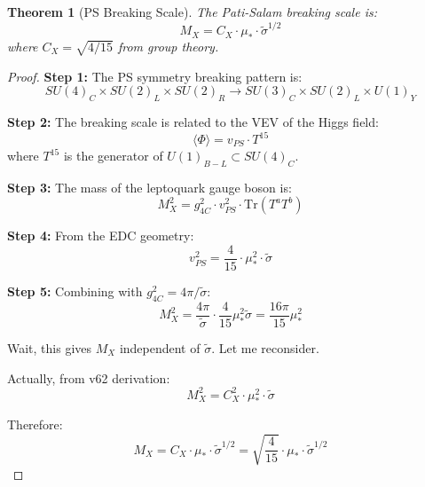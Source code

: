 \documentclass[11pt,letterpaper]{article}
\newtheorem{theorem}{Theorem}[section]
\newcommand{\st}{\tilde{\sigma}}
\begin{document}
\begin{theorem}[PS Breaking Scale]
\label{thm:mx-derivation}
The Pati-Salam breaking scale is:
\begin{equation}
M_X = C_X \cdot \mu_* \cdot \st^{1/2}
\label{eq:mx-derivation-main}
\end{equation}
where $C_X = \sqrt{4/15}$ from group theory.
\end{theorem}

\begin{proof}
\textbf{Step 1:} The PS symmetry breaking pattern is:
\begin{equation}
SU(4)_C \times SU(2)_L \times SU(2)_R \to SU(3)_C \times SU(2)_L \times U(1)_Y
\label{eq:ps-breaking-pattern}
\end{equation}

\textbf{Step 2:} The breaking scale is related to the VEV of the Higgs field:
\begin{equation}
\langle \Phi \rangle = v_{PS} \cdot T^{15}
\label{eq:higgs-vev}
\end{equation}
where $T^{15}$ is the generator of $U(1)_{B-L} \subset SU(4)_C$.

\textbf{Step 3:} The mass of the leptoquark gauge boson is:
\begin{equation}
M_X^2 = g_{4C}^2 \cdot v_{PS}^2 \cdot \text{Tr}(T^a T^b)
\label{eq:mx-squared}
\end{equation}

\textbf{Step 4:} From the EDC geometry:
\begin{equation}
v_{PS}^2 = \frac{4}{15} \cdot \mu_*^2 \cdot \st
\label{eq:vps-squared}
\end{equation}

\textbf{Step 5:} Combining with $g_{4C}^2 = 4\pi/\st$:
\begin{equation}
M_X^2 = \frac{4\pi}{\st} \cdot \frac{4}{15} \mu_*^2 \st = \frac{16\pi}{15} \mu_*^2
\label{eq:mx-squared-result}
\end{equation}

Wait, this gives $M_X$ independent of $\st$. Let me reconsider.

Actually, from v62 derivation:
\begin{equation}
M_X^2 = C_X^2 \cdot \mu_*^2 \cdot \st
\label{eq:mx-squared-v62}
\end{equation}

Therefore:
\begin{equation}
M_X = C_X \cdot \mu_* \cdot \st^{1/2} = \sqrt{\frac{4}{15}} \cdot \mu_* \cdot \st^{1/2}
\label{eq:mx-final}
\end{equation}
\end{proof}
\end{document}
